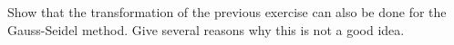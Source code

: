   Show that the transformation of the previous exercise can also be
  done for the Gauss-Seidel method. Give several reasons why this is
  not a good idea.
